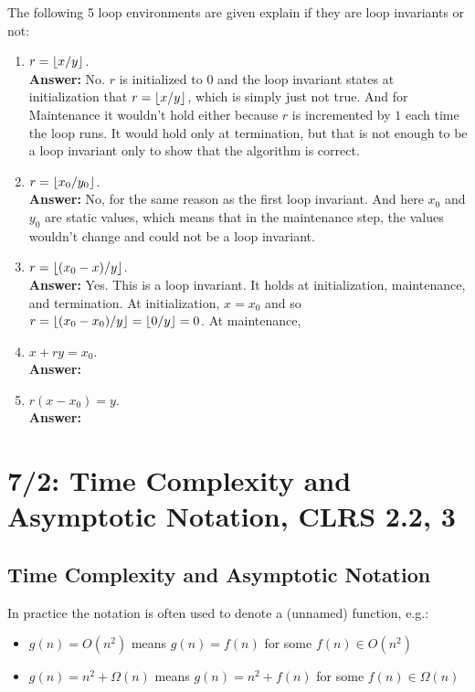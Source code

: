 The following 5 loop environments are given explain if they are loop invariants or not:
\begin{enumerate}
  \item $r = \left\lfloor{x/y}\right\rfloor$. \\
        \textbf{Answer:} No. $r$ is initialized to $0$ and the loop invariant states at initialization that $r = \left\lfloor{x/y}\right\rfloor$, which is simply just not true. And for Maintenance it wouldn't hold either because $r$ is incremented by $1$ each time the loop runs. It would hold only at termination, but that is not enough to be a loop invariant only to show that the algorithm is correct.
  \item $r = \left\lfloor{x_0/y_0}\right\rfloor$. \\
        \textbf{Answer:} No, for the same reason as the first loop invariant. And here $x_0$ and $y_0$ are static values, which means that in the maintenance step, the values wouldn't change and could not be a loop invariant.
  \item $r=\left\lfloor{(x_0 - x)/y}\right\rfloor$. \\
        \textbf{Answer:} Yes. This is a loop invariant. It holds at initialization, maintenance, and termination. At initialization, $x = x_0$ and so $r = \left\lfloor{(x_0 - x_0)/y}\right\rfloor = \left\lfloor{0/y}\right\rfloor = 0$. At maintenance,
  \item $x + ry = x_0$. \\
        \textbf{Answer:}
  \item $r(x - x_0) = y$. \\
        \textbf{Answer:}
\end{enumerate}

\section{7/2: Time Complexity and Asymptotic Notation, CLRS 2.2, 3}

\subsection{Time Complexity and Asymptotic Notation}
In practice the notation is often used to denote a (unnamed) function, e.g.:
\begin{itemize}
  \item \( g(n) = O(n^2) \) means \( g(n) = f(n) \) for some \( f(n) \in O(n^2) \)
  \item \( g(n) = n^2 + \Omega(n) \) means \( g(n) = n^2 + f(n) \) for some \( f(n) \in \Omega(n) \)
\end{itemize}

